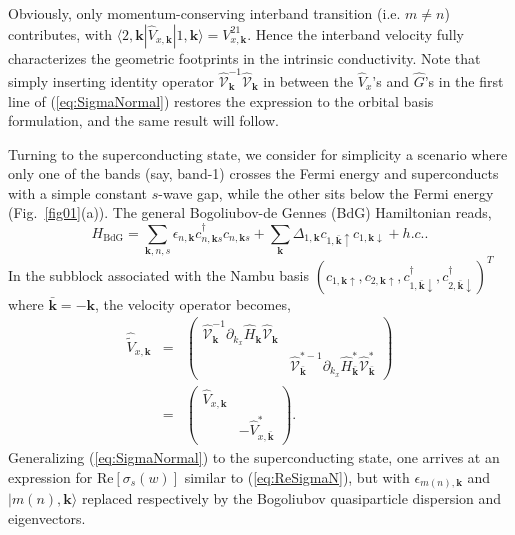 \documentclass[prl,floatfix,twocolumn,showpacs,amsmath,superscriptaddress]{revtex4-2}
\newcommand{\ua}{\uparrow}
\newcommand{\da}{\downarrow}
\renewcommand{\vec}[1]{\mathbf{#1}}
\newcommand{\vk}{{\vec{k}}}
\begin{document}
Obviously, only momentum-conserving interband transition (i.e. $m\neq n$) contributes, with $\langle 2,\vk| \hat{V}_{x,\vk}  | 1,\vk \rangle=V_{x,\vk}^{21}$. Hence the interband velocity fully characterizes the geometric footprints in the intrinsic conductivity. Note that simply inserting identity operator $\hat{\mathcal{V}}_\vk^{-1}\hat{\mathcal{V}}_\vk$ in between the $\hat{V}_x$'s and $\hat{G}$'s in the first line of (\ref{eq:SigmaNormal}) restores the expression to the orbital basis formulation, and the same result will follow. 

Turning to the superconducting state, we consider for simplicity a scenario where only one of the bands (say, band-1) crosses the Fermi energy and superconducts with a simple constant $s$-wave gap, while the other sits below the Fermi energy (Fig.~\ref{fig01}(a)). The general Bogoliubov-de Gennes (BdG) Hamiltonian reads, 
\begin{equation}
	H_\text{BdG} =\sum_{\vk, n, s}\epsilon_{n,\vk} c^\dagger_{n,\vk s}c_{n,\vk s} + \sum_{\vk}\Delta_{1,\vk} c_{1,\bar{\vk}\ua}c_{1,\vk\da} +h.c. .
	\label{eq:HBdG}
\end{equation}
In the subblock associated with the Nambu basis $(c_{1,\vk\ua},c_{2,\vk\ua},c^\dagger_{1,\bar{\vk}\da},c^\dagger_{2,\bar{\vk}\da})^T$ where $\bar{\vk}=-\vk$, the velocity operator becomes,
\begin{eqnarray}
	\hat{\widetilde{V}}_{x,\vk}&=&\begin{pmatrix}
		\hat{\mathcal{V}}^{-1}_\vk \partial_{k_x} \hat{H}_\vk \hat{\mathcal{V}}_\vk & \\
		& \hat{\mathcal{V}}^{*-1}_{\bar{\vk}} \partial_{k_x} \hat{H}^*_{\bar{\vk}} \hat{\mathcal{V}}^*_{\bar{\vk}} 
	\end{pmatrix}\nonumber \\
	&=&\begin{pmatrix}
		\hat{V}_{x,\vk} & \\
		& -\hat{V}^*_{x,\bar{\vk}} 
	\end{pmatrix}.
\end{eqnarray}
Generalizing (\ref{eq:SigmaNormal}) to the superconducting state, one arrives at an expression for $\text{Re} \left[\sigma_s(w)\right]$ similar to (\ref{eq:ReSigmaN}), but with $\epsilon_{m(n),\vk}$ and $|m(n),\vk\rangle$ replaced respectively by the Bogoliubov quasiparticle dispersion and eigenvectors. 
\end{document}
